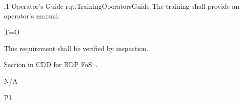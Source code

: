 \ONERQMTV
{\RqtNumberBase.1}
{Operator's Guide}
{rqt:TrainingOperatorsGuide}
{The \ThisSys training shall provide an operator's manual.}
{
	\item [Phase 1] T=O
}
{This requirement shall be verified by inspection.}
{
\item [12.3] Section in CDD for BDP FoS~\cite{ref__BDP_FOS_CDD}.
}
{
	\item N/A
}
{P1}

